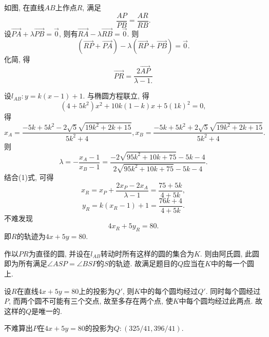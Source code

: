 \documentclass{article}
\begin{document}
	如图, 在直线$AB$上作点$R$, 满足
	\[\frac{AP}{PB}=\frac{AR}{RB}.\]
	设$\overrightarrow{PA}+\lambda\overrightarrow{PB}=\overrightarrow{0}$, 则有$\overrightarrow{RA}-\lambda\overrightarrow{RB}=\overrightarrow{0}$. 则
	\[\left(\overrightarrow{RP}+\overrightarrow{PA}\right)-\lambda\left(\overrightarrow{RP}+\overrightarrow{PB}\right)=\overrightarrow{0}.\]
	化简, 得
	\begin{equation}
		\overrightarrow{PR}=\frac{2\overrightarrow{AP}}{\lambda-1.}
	\end{equation}\par
	设$l_{AB}: y=k(x-1)+1$. 与椭圆方程联立, 得
	\[\left(4+5k^2\right)x^2+10k(1-k)x+5(1k)^2=0,\]
	得
	\[x_A=\frac{-5k+5 k^2-2 \sqrt{5} \sqrt{19 k^2+2 k+15}}{5 k^2+4},x_B=\frac{-5k+5 k^2+2 \sqrt{5} \sqrt{19 k^2+2 k+15}}{5 k^2+4}.\]
	则
	\[\lambda=-\frac{x_A-1}{x_B-1}=\frac{-2 \sqrt{95 k^2+10 k+75}-5 k-4}{2 \sqrt{95 k^2+10 k+75}-5 k-4}.\]
	结合(1)式, 可得
	\[x_R=x_P+\frac{2x_P-2x_A}{\lambda-1}=\frac{75+5k}{4+5k},\]
	\[y_R=k(x_R-1)+1=\frac{76k+4}{4+5k}.\]
	不难发现
	\[4x_R+5y_R=80.\]
	即$R$的轨迹为$4x+5y=80$.\par
	作以$PR$为直径的圆, 并设在$l_{AB}$转动时所有这样的圆的集合为$K$. 则由阿氏圆, 此圆即为所有满足$\angle ASP=\angle BSP$的$S$的轨迹. 故满足题目的$Q$应当在$K$中的每一个圆上.\par
	设$R$在直线$4x+5y=80$上的投影为$Q'$, 则$K$中的每个圆均经过$Q'$. 同时每个圆经过$P$, 而两个圆不可能有三个交点, 故至多存在两个点, 使$K$中每个圆均经过此两点. 故这样的$Q$是唯一的.\par 
	不难算出$P$在$4x+5y=80$的投影为$Q:(325/41,396/41)$.
\end{document}
